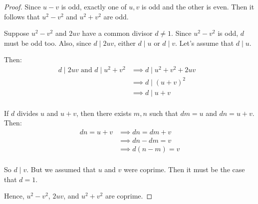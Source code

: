 \documentclass[letterpaper, 12pt]{memoir}
\theoremstyle{mystyle}
\begin{document}
\begin{proof}
    Since $u-v$ is odd, exactly one of $u,v$ is odd and the other is even. Then 
    it follows that $u^2-v^2$ and $u^2+v^2$ are odd.

    Suppose $u^2-v^2$ and $2uv$ have a common divisor $d \neq 1$. Since
    $u^2-v^2$ is odd, $d$ must be odd too. Also, since $d \mid 2uv$, either
    $d \mid u$ or $d \mid v$. Let's assume that $d \mid u$.

    Then:
    \begin{align*}
    d \mid 2uv \text{ and } d \mid u^2+v^2  &\implies d \mid u^2+v^2 + 2uv & \\
                                            &\implies d \mid (u+v)^2 \\
                                            &\implies d \mid u+v \\
    \end{align*}

    If $d$ divides $u$ and $u+v$, then there exists $m,n$ such that $dm = u$ and
    $dn = u+v$. Then:
    \begin{align*}
    dn = u+v    &\implies dn = dm+v \\
                &\implies dn-dm = v \\
                &\implies d(n-m) = v \\
    \end{align*}

    So $d \mid v$. But we assumed that $u$ and $v$ were coprime. Then it must
    be the case that $d=1$.

    Hence, $u^2-v^2$, $2uv$, and  $u^2+v^2$ are coprime.
\end{proof}
\end{document}
